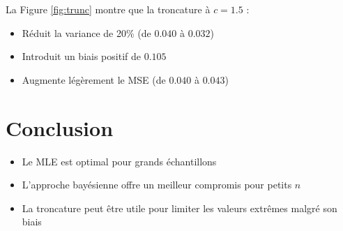 \documentclass[12pt]{article}
\begin{document}
	La Figure \ref{fig:trunc} montre que la troncature à $c=1.5$ :
	\begin{itemize}
		\item Réduit la variance de 20\% (de $0.040$ à $0.032$)
		\item Introduit un biais positif de $0.105$
		\item Augmente légèrement le MSE (de $0.040$ à $0.043$)
	\end{itemize}
	
	\section{Conclusion}
	\begin{itemize}
		\item Le MLE est optimal pour grands échantillons
		\item L'approche bayésienne offre un meilleur compromis pour petits $n$
		\item La troncature peut être utile pour limiter les valeurs extrêmes malgré son biais
	\end{itemize}
	
\end{document}
